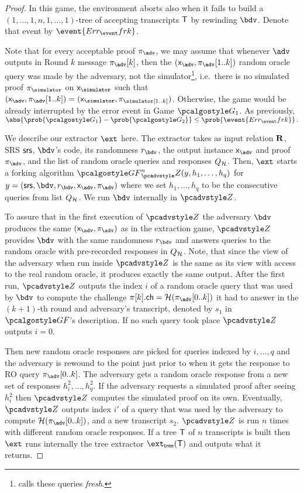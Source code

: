 \begin{proof}
		In this game, the environment aborts also when it fails to build a
		$(1, \ldots, 1, n, 1, \ldots, 1)$-tree of accepting transcripts $\mathsf{T}$ by rewinding
		$\bdv$. Denote that event by $\event{\errfrk}$.
	
		Note that for every acceptable proof $\zkproof_{\advse}$, we may
		assume that whenever $\advse$ outputs in Round $k$ message $\zkproof_{\advse}[k]$, then the
		$(\inp_{\advse}, \zkproof_{\advse}[1..k])$ random oracle query was made by the adversary, not
		the simulator\footnote{\cite{INDOCRYPT:FKMV12} calls these queries \emph{fresh}.}, i.e.~there
		is no simulated proof $\zkproof_\simulator$ on $\inp_\simulator$ such that
		$(\inp_{\advse}, \zkproof_{\advse} [1..k]) = (\inp_\simulator,
		\zkproof_\simulator[1..k])$. Otherwise, the game would be already interrupted by the error
		event in Game $\game{1}$.  As previously,
		\( \abs{\prob{\game{1}} - \prob{\game{2}}} \leq \prob{\event{\errfrk}}\,.  \)
		
		We describe our extractor $\ext$ here. The extractor takes as input relation $\mathbf{R}$, SRS
		$\mathsf{srs}$, $\bdv$'s code, its randomness $r_\bdv$, the output instance $\inp_{\advse}$ and proof
		$\zkproof_{\advse}$, and the list of random oracle queries and responses $Q_{\mathcal{H}}$. Then, $\ext$
		starts a forking algorithm $\genforking^{n}_\zdv(y,h_1, \ldots, h_q)$ for
		$y = (\srs, \bdv, r_\bdv, \inp_{\advse}, \zkproof_{\advse})$ where we set $h_1, \ldots, h_q$ to
		be the consecutive queries from list $Q_{\mathcal{H}}$. We run $\bdv$ internally in $\zdv$.
		
		To assure that in the first execution of $\zdv$ the adversary $\bdv$ produces the same
		$(\inp_{\advse}, \zkproof_{\advse})$ as in the extraction game, $\zdv$ provides $\bdv$ with
		the same randomness $r_\bdv$ and answers queries to the random oracle with
		pre-recorded responses in $Q_{\mathcal{H}}$.
		Note, that since the view of the adversary when run inside $\zdv$ is the same as its view with
		access to the real random oracle, it produces exactly the same output. After the
		first run, $\zdv$ outputs the index $i$ of a random oracle query that was used by $\bdv$ to
		compute the challenge $\zkproof[k].\ch = \ro(\zkproof_{\advse}[0..k])$ it had to answer in the
		$(k + 1)$-th round and adversary's transcript, denoted by $s_1$ in $\genforking$'s
		description. If no such query took place $\zdv$ outputs $i = 0$.
		
		Then new random oracle responses are picked for queries indexed by
		$i, \ldots, q$ and the adversary is rewound to the point just prior to when it gets the
		response to RO query $\zkproof_{\advse}[0..k]$. The adversary gets a random
		oracle response from a new set of responses $h^2_i, \ldots, h^2_q$. If the
		adversary requests a simulated proof after seeing $h^2_i$ then $\zdv$ computes
		the simulated proof on its own. Eventually, $\zdv$ outputs index $i'$ of a query
		that was used by the adversary to compute $\ro(\zkproof_{\advse}[0..k])$, and a
		new transcript $s_2$. $\zdv$ is run $n$ times with different random oracle
		responses. If a tree $\mathsf{T}$ of $n$ transcripts is built then $\ext$
		runs internally the tree extractor $\extt(\tree)$ and outputs what it returns.
		

\end{proof}
